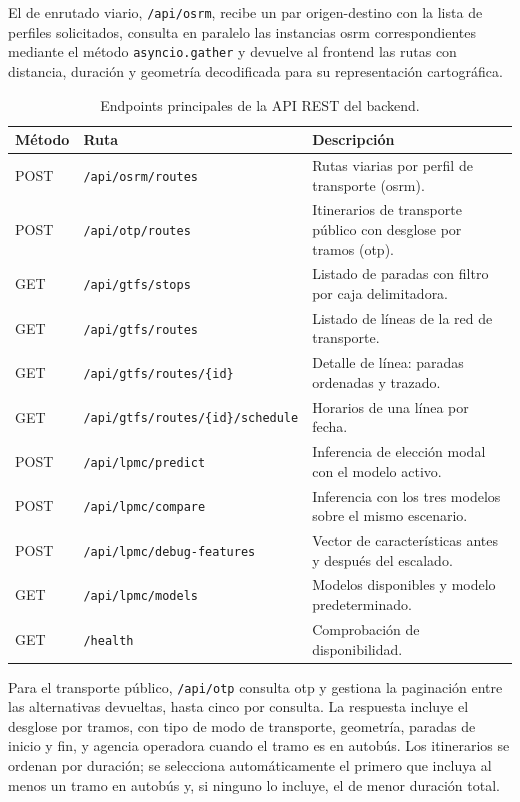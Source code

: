 El de enrutado viario, \texttt{/api/osrm}, recibe un par origen-destino con la lista de perfiles solicitados, consulta en paralelo las instancias \gls{osrm} correspondientes mediante el método \texttt{asyncio.gather} y devuelve al frontend las rutas con distancia, duración y geometría decodificada para su representación cartográfica.
\newpage

\begin{table}[htbp]
  \caption{Endpoints principales de la API REST del backend.}
  \label{tab:endpoints_api}
  \centering
  \begin{tabular}{llp{6.5cm}}
    \hline
    \textbf{Método} & \textbf{Ruta} & \textbf{Descripción} \\
    \hline
    POST & \texttt{/api/osrm/routes}                  & Rutas viarias por perfil de transporte (\gls{osrm}). \\
    POST & \texttt{/api/otp/routes}                   & Itinerarios de transporte público con desglose por tramos (\gls{otp}). \\
    GET  & \texttt{/api/gtfs/stops}                   & Listado de paradas con filtro por caja delimitadora. \\
    GET  & \texttt{/api/gtfs/routes}                  & Listado de líneas de la red de transporte. \\
    GET  & \texttt{/api/gtfs/routes/\{id\}}           & Detalle de línea: paradas ordenadas y trazado. \\
    GET  & \texttt{/api/gtfs/routes/\{id\}/schedule}  & Horarios de una línea por fecha. \\
    POST & \texttt{/api/lpmc/predict}                 & Inferencia de elección modal con el modelo activo. \\
    POST & \texttt{/api/lpmc/compare}                 & Inferencia con los tres modelos sobre el mismo escenario. \\
    POST & \texttt{/api/lpmc/debug-features}          & Vector de características antes y después del escalado. \\
    GET  & \texttt{/api/lpmc/models}                  & Modelos disponibles y modelo predeterminado. \\
    GET  & \texttt{/health}                           & Comprobación de disponibilidad. \\
    \hline
  \end{tabular}
\end{table}
\vspace{-8mm}
Para el transporte público, \texttt{/api/otp} consulta \acrlong{otp} y gestiona la paginación entre las alternativas devueltas, hasta cinco por consulta. La respuesta incluye el desglose por tramos, con tipo de modo de transporte, geometría, paradas de inicio y fin, y agencia operadora cuando el tramo es en autobús. Los itinerarios se ordenan por duración; se selecciona automáticamente el primero que incluya al menos un tramo en autobús y, si ninguno lo incluye, el de menor duración total.

